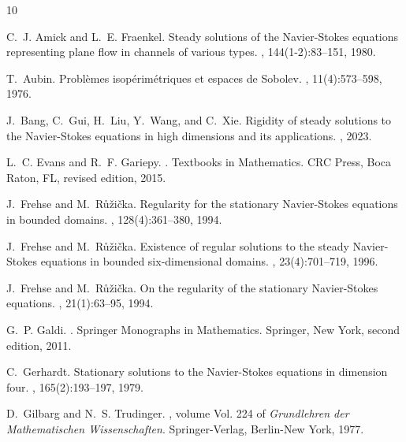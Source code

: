 \documentclass[12pt]{amsart}
\begin{document}
\begin{thebibliography}{10}
	
	C.~J. Amick and L.~E. Fraenkel.
	\newblock Steady solutions of the {N}avier-{S}tokes equations representing
	plane flow in channels of various types.
	, 144(1-2):83--151, 1980.
	
	T.~Aubin.
	\newblock Probl\`emes isop\'erim\'etriques et espaces de {S}obolev.
	, 11(4):573--598, 1976.
	
	J.~Bang, C.~Gui, H.~Liu, Y.~Wang, and C.~Xie.
	\newblock Rigidity of steady solutions to the {N}avier-{S}tokes equations in
	high dimensions and its applications.
	, 2023.
	
	L.~C. Evans and R.~F. Gariepy.
	.
	\newblock Textbooks in Mathematics. CRC Press, Boca Raton, FL, revised edition,
	2015.
	
	J.~Frehse and M.~R{\r u}\v{z}i\v{c}ka.
	\newblock Regularity for the stationary {N}avier-{S}tokes equations in bounded
	domains.
	, 128(4):361--380, 1994.
	
	J.~Frehse and M.~R{\r u}\v{z}i\v{c}ka.
	\newblock Existence of regular solutions to the steady {N}avier-{S}tokes
	equations in bounded six-dimensional domains.
	, 23(4):701--719, 1996.
	
	J.~Frehse and M.~R{\r u}{\v{z}}i{\v{c}}ka.
	\newblock On the regularity of the stationary {N}avier-{S}tokes equations.
	, 21(1):63--95, 1994.
	
	G.~P. Galdi.
	.
	\newblock Springer Monographs in Mathematics. Springer, New York, second
	edition, 2011.
	
	C.~Gerhardt.
	\newblock Stationary solutions to the {N}avier-{S}tokes equations in dimension
	four.
	, 165(2):193--197, 1979.
	
	D.~Gilbarg and N.~S. Trudinger.
	, volume
	Vol. 224 of {\em Grundlehren der Mathematischen Wissenschaften}.
	\newblock Springer-Verlag, Berlin-New York, 1977.
	

\end{thebibliography}
\end{document}
